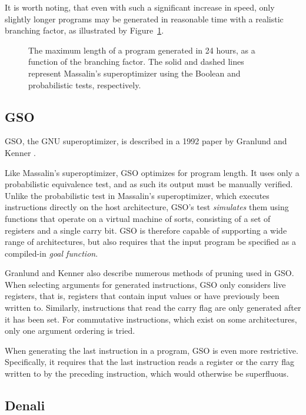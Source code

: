 \documentclass[a4paper,11pt]{kth-mag}
\begin{document}

It is worth noting, that even with such a significant increase in speed, only slightly longer programs may be generated in reasonable time with a realistic branching factor, as illustrated by Figure~\ref{fig:so_program_length}.

\begin{figure}
\centering

\caption{The maximum length of a program generated in 24 hours, as a function of the branching factor. %
The solid and dashed lines represent Massalin's superoptimizer using the Boolean and probabilistic tests, respectively.}
\label{fig:so_program_length}
\end{figure}

\subsection{GSO}

GSO, the GNU superoptimizer, is described in a 1992 paper by Granlund and Kenner \cite{granlund92}.

Like Massalin's superoptimizer, GSO optimizes for program length.
It uses only a probabilistic equivalence test, and as such its output must be manually verified.
Unlike the probabilistic test in Massalin's superoptimizer, which executes instructions directly on the host architecture, GSO's test \emph{simulates} them using functions that operate on a virtual machine of sorts, consisting of a set of registers and a single carry bit.
GSO is therefore capable of supporting a wide range of architectures, but also requires that the input program be specified as a compiled-in \emph{goal function}.

Granlund and Kenner also describe numerous methods of pruning used in GSO.
When selecting arguments for generated instructions, GSO only considers live registers, that is, registers that contain input values or have previously been written to.
Similarly, instructions that read the carry flag are only generated after it has been set.
For commutative instructions, which exist on some architectures, only one argument ordering is tried.

When generating the last instruction in a program, GSO is even more restrictive.
Specifically, it requires that the last instruction reads a register or the carry flag written to by the preceding instruction, which would otherwise be superfluous.

\subsection{Denali}
\end{document}
